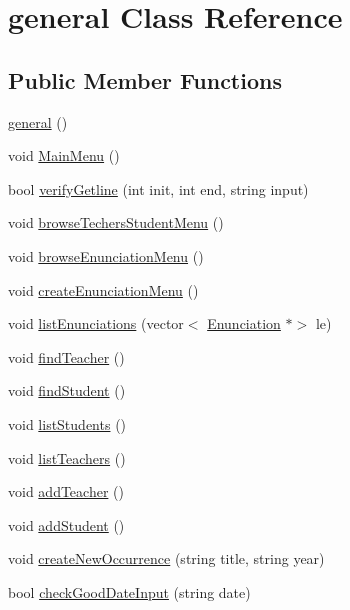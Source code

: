 \hypertarget{classgeneral}{}\section{general Class Reference}
\label{classgeneral}
\subsection*{Public Member Functions}
\begin{DoxyCompactItemize}
\item 
\hyperlink{classgeneral_a2a4fcaecb7d07e416a1188dee4fee767}{general} ()
\item 
void \hyperlink{classgeneral_ae11e9494ad52be040c2142bcfcb0c941}{Main\+Menu} ()
\item 
bool \hyperlink{classgeneral_a172fa5be50f0483a784daf5efcf117bc}{verify\+Getline} (int init, int end, string input)
\item 
void \hyperlink{classgeneral_a3751bee24e91f6924c028e8bd64879a8}{browse\+Techers\+Student\+Menu} ()
\item 
void \hyperlink{classgeneral_a0d1a8211230c588f90fede86f9a2976a}{browse\+Enunciation\+Menu} ()
\item 
void \hyperlink{classgeneral_ad6daefa1c532dd391c0b6d8c135eaec9}{create\+Enunciation\+Menu} ()
\item 
void \hyperlink{classgeneral_a2e8fee17772bc0ac04febd375ef98828}{list\+Enunciations} (vector$<$ \hyperlink{class_enunciation}{Enunciation} $\ast$$>$ le)
\item 
void \hyperlink{classgeneral_aaccf7ec238e4fb8f4f2430631764e87d}{find\+Teacher} ()
\item 
void \hyperlink{classgeneral_a7afc234dd64c7d7aa6caa64fa3029c5c}{find\+Student} ()
\item 
void \hyperlink{classgeneral_aa665c4f70405eae43862283c8f1c4268}{list\+Students} ()
\item 
void \hyperlink{classgeneral_aff78b35c2e50ad021d061977c4add3d8}{list\+Teachers} ()
\item 
void \hyperlink{classgeneral_a56cd18e2da56b705bc537d1c8f5ba7cc}{add\+Teacher} ()
\item 
void \hyperlink{classgeneral_a981fdd9aa5bca7fc3b997e328eeb2f64}{add\+Student} ()
\item 
void \hyperlink{classgeneral_a474cd69b70294468f3f004d594803a1a}{create\+New\+Occurrence} (string title, string year)
\item 
bool \hyperlink{classgeneral_a1420e73bcdd612483c7ffb5cb065d452}{check\+Good\+Date\+Input} (string date)
$$
\end{DoxyCompactItemize}
